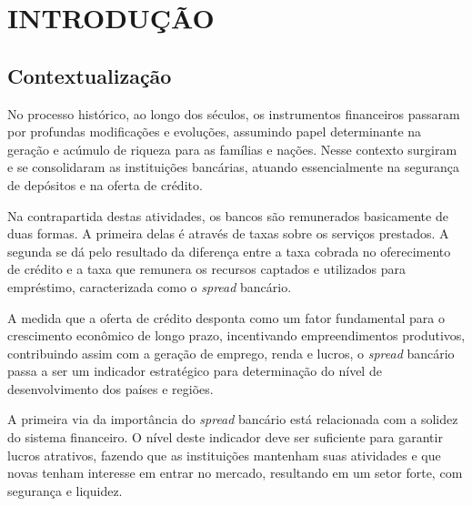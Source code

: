 \documentclass[12pt,openright,oneside,a4paper,chapter=TITLE,section=TITLE,subsection=TITLE,english,french,spanish,portugues,sumario=tradicional]{04-class-files/abntex2}
\begin{document}




\textual
\pagestyle{simple}

\parindent 1.50cm

\chapter[introducao]{INTRODUÇÃO}

\section{Contextualização}

No processo histórico, ao longo dos séculos, os instrumentos financeiros
passaram por profundas modificações e evoluções, assumindo papel determinante
na geração e acúmulo de riqueza para as famílias e nações. Nesse contexto
surgiram e se consolidaram as instituições bancárias, atuando essencialmente na
segurança de depósitos e na oferta de crédito.

Na contrapartida destas atividades, os bancos são remunerados basicamente de
duas formas. A primeira delas é através de taxas sobre os serviços prestados. A
segunda se dá pelo resultado da diferença entre a taxa cobrada no oferecimento
de crédito e a taxa que remunera os recursos captados e utilizados para
empréstimo, caracterizada como o \emph{spread} bancário.

A medida que a oferta de crédito desponta como um fator fundamental para o
crescimento econômico de longo prazo, incentivando empreendimentos produtivos,
contribuindo assim com a geração de emprego, renda e lucros, o \emph{spread} bancário passa a ser um indicador estratégico para determinação do nível de desenvolvimento dos países e regiões.

A primeira via da importância do \emph{spread} bancário está relacionada com a
solidez do sistema financeiro. O nível deste indicador deve ser suficiente para
garantir lucros atrativos, fazendo que as instituições mantenham suas
atividades e que novas tenham interesse em entrar no mercado, resultando em um
setor forte, com segurança e liquidez.
\end{document}
